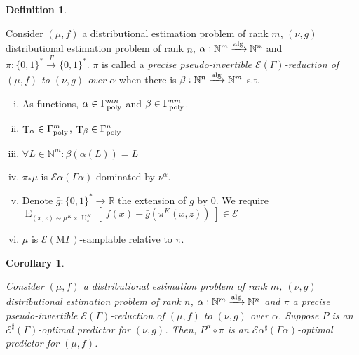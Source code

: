 \documentclass{article}
\numberwithin{equation}{section}
\theoremstyle{definition}
\newtheorem{definition}{Definition}[section]
\theoremstyle{plain}
\newtheorem{corollary}{Corollary}[section]
\newcommand{\Bool}{\{0,1\}}
\newcommand{\Words}{{\Bool^*}}
\DeclareMathOperator{\E}{E}
\DeclareMathOperator{\T}{T}
\DeclareMathOperator{\Un}{U}
\newcommand{\Nats}{\mathbb{N}}
\newcommand{\Reals}{\mathbb{R}}
\newcommand{\Abs}[1]{\lvert #1 \rvert}
\newcommand{\MGrow}{\mathrm{M}\Gamma}
\newcommand{\Fall}{\mathcal{E}}
\newcommand{\EG}{\Fall(\Gamma)}
\newcommand{\ESG}{\Fall^\sharp(\Gamma)}
\newcommand{\EMG}{\Fall(\MGrow)}
\newcommand{\Alg}{\xrightarrow{\textnormal{alg}}}
\newcommand{\Scheme}{\xrightarrow{\Gamma}}
\begin{document}
\begin{samepage}
\begin{definition}
\label{def:pp_reduce}

Consider $(\mu,f)$ a distributional estimation problem of rank ${m}$, $(\nu,g)$ distributional estimation problem of rank ${n}$, ${\alpha: \Nats^m \Alg \Nats^n}$ and ${\pi: \Words \Scheme \Words}$. $\pi$ is called a \emph{precise pseudo-invertible $\EG$-reduction of $(\mu,f)$ to $(\nu,g)$ over ${\alpha}$} when there is ${\beta: \Nats^n \Alg \Nats^m}$ s.t.

\begin{enumerate}[(i)]

\item\label{con:def__pp_reduce__pol_deg} As functions, ${\alpha \in \Gamma_{\textnormal{poly}}^{mn}}$ and ${\beta \in \Gamma_{\textnormal{poly}}^{nm}}$.

\item\label{con:def__pp_reduce__eff_deg} ${\T_\alpha \in \Gamma_{\textnormal{poly}}^m}$, ${\T_\beta \in \Gamma_{\textnormal{poly}}^n}$

\item\label{con:def__pp_reduce__inv_deg} $\forall L \in \Nats^m: \beta(\alpha(L))=L$

\item\label{con:def__pp_reduce__dist} ${\pi_*\mu}$ is ${\Fall \alpha(\Gamma \alpha)}$-dominated by ${\nu^\alpha}$.

\item\label{con:def__pp_reduce__fun} Denote ${\bar{g}: \Words \rightarrow \Reals}$ the extension of $g$ by 0. We require $\E_{(x,z) \sim \mu^{K} \times \Un_\pi^{K}}[\Abs{f(x)-\bar{g}(\pi^{K}(x,z))}] \in \Fall$

\item\label{con:def__pp_reduce__smp} $\mu$ is $\EMG$-samplable relative to $\pi$.

\end{enumerate}

\end{definition}
\end{samepage}

\begin{samepage}
\begin{corollary}
\label{crl:pp_reduce_sharp}

Consider $(\mu,f)$ a distributional estimation problem of rank ${m}$, $(\nu,g)$ distributional estimation problem of rank ${n}$, ${\alpha: \Nats^m \Alg \Nats^n}$ and $\pi$ a precise pseudo-invertible $\EG$-reduction of $(\mu, f)$ to $(\nu, g)$ over ${\alpha}$. Suppose $P$ is an $\ESG$-optimal predictor for $(\nu, g)$. Then, $P^\alpha \circ \pi$ is an $\Fall \alpha^\sharp (\Gamma \alpha)$-optimal predictor for $(\mu, f)$.

\end{corollary}
\end{samepage}
\end{document}
